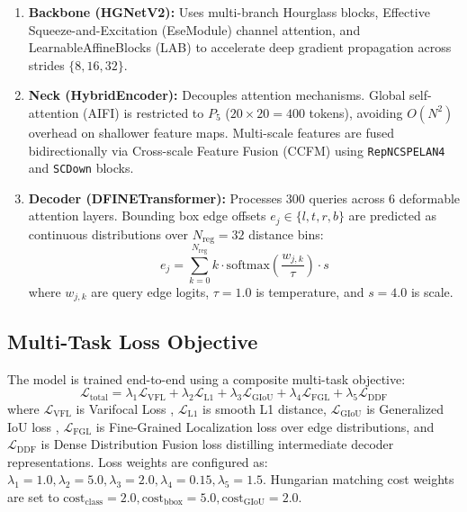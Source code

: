 \documentclass[conference]{IEEEtran}
\begin{document}
\begin{enumerate}
    \item \textbf{Backbone (HGNetV2):} Uses multi-branch Hourglass blocks, Effective Squeeze-and-Excitation (EseModule) channel attention, and LearnableAffineBlocks (LAB) to accelerate deep gradient propagation across strides $\{8, 16, 32\}$.
    \item \textbf{Neck (HybridEncoder):} Decouples attention mechanisms. Global self-attention (AIFI) is restricted to $P_5$ ($20\times20 = 400$ tokens), avoiding $O(N^2)$ overhead on shallower feature maps. Multi-scale features are fused bidirectionally via Cross-scale Feature Fusion (CCFM) using \texttt{RepNCSPELAN4} and \texttt{SCDown} blocks.
    \item \textbf{Decoder (DFINETransformer):} Processes 300 queries across 6 deformable attention layers. Bounding box edge offsets $e_j \in \{l, t, r, b\}$ are predicted as continuous distributions over $N_{\text{reg}} = 32$ distance bins:
    \begin{equation}
    e_j = \sum_{k=0}^{N_{\text{reg}}} k \cdot \text{softmax}\left(\frac{w_{j,k}}{\tau}\right) \cdot s
    \label{eq:dfine}
    \end{equation}
    where $w_{j,k}$ are query edge logits, $\tau = 1.0$ is temperature, and $s = 4.0$ is scale.
\end{enumerate}

\subsection{Multi-Task Loss Objective}
The model is trained end-to-end using a composite multi-task objective:
\begin{equation}
\mathcal{L}_{\text{total}} = \lambda_1 \mathcal{L}_{\text{VFL}} + \lambda_2 \mathcal{L}_{\text{L1}} + \lambda_3 \mathcal{L}_{\text{GIoU}} + \lambda_4 \mathcal{L}_{\text{FGL}} + \lambda_5 \mathcal{L}_{\text{DDF}}
\label{eq:loss}
\end{equation}
where $\mathcal{L}_{\text{VFL}}$ is Varifocal Loss \cite{varifocal}, $\mathcal{L}_{\text{L1}}$ is smooth L1 distance, $\mathcal{L}_{\text{GIoU}}$ is Generalized IoU loss \cite{giou}, $\mathcal{L}_{\text{FGL}}$ is Fine-Grained Localization loss over edge distributions, and $\mathcal{L}_{\text{DDF}}$ is Dense Distribution Fusion loss distilling intermediate decoder representations. Loss weights are configured as: $\lambda_1 = 1.0, \lambda_2 = 5.0, \lambda_3 = 2.0, \lambda_4 = 0.15, \lambda_5 = 1.5$. Hungarian matching cost weights are set to $\text{cost}_{\text{class}} = 2.0, \text{cost}_{\text{bbox}} = 5.0, \text{cost}_{\text{GIoU}} = 2.0$.
\end{document}
